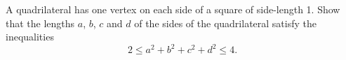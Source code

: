 A quadrilateral has one vertex on each side of a square of side-length 1. Show that the lengths $a$,  $b$,  $c$ and $d$ of the sides of the quadrilateral satisfy the inequalities \[ 2\le a^2+b^2+c^2+d^2\le 4. \]